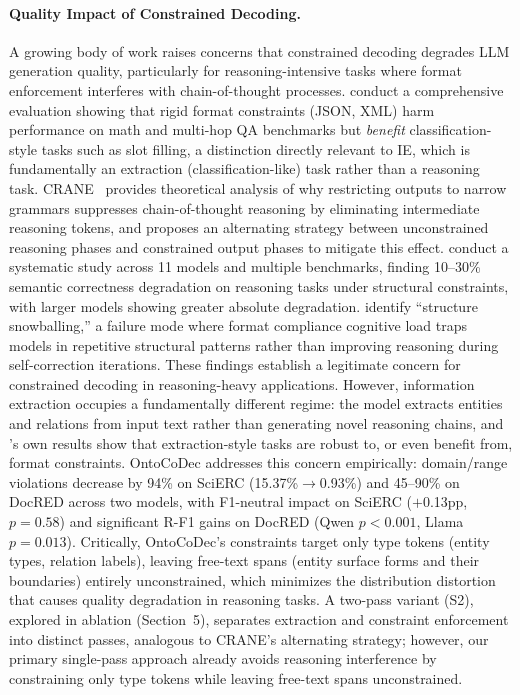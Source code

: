 \paragraph{Quality Impact of Constrained Decoding.}
A growing body of work raises concerns that constrained decoding degrades LLM generation quality, particularly for reasoning-intensive tasks where format enforcement interferes with chain-of-thought processes.
\citet{tam2024letmespeak} conduct a comprehensive evaluation showing that rigid format constraints (JSON, XML) harm performance on math and multi-hop QA benchmarks but \emph{benefit} classification-style tasks such as slot filling, a distinction directly relevant to IE, which is fundamentally an extraction (classification-like) task rather than a reasoning task.
CRANE~\cite{banerjee2025crane} provides theoretical analysis of why restricting outputs to narrow grammars suppresses chain-of-thought reasoning by eliminating intermediate reasoning tokens, and proposes an alternating strategy between unconstrained reasoning phases and constrained output phases to mitigate this effect.
\citet{schall2025hiddencost} conduct a systematic study across 11 models and multiple benchmarks, finding 10--30\% semantic correctness degradation on reasoning tasks under structural constraints, with larger models showing greater absolute degradation.
\citet{zhou2026snowballing} identify ``structure snowballing,'' a failure mode where format compliance cognitive load traps models in repetitive structural patterns rather than improving reasoning during self-correction iterations.
These findings establish a legitimate concern for constrained decoding in reasoning-heavy applications.
However, information extraction occupies a fundamentally different regime: the model extracts entities and relations from input text rather than generating novel reasoning chains, and \citet{tam2024letmespeak}'s own results show that extraction-style tasks are robust to, or even benefit from, format constraints.
OntoCoDec addresses this concern empirically: domain/range violations decrease by 94\% on SciERC (15.37\%$\to$0.93\%) and 45--90\% on DocRED across two models, with F1-neutral impact on SciERC ($+$0.13pp, $p{=}0.58$) and significant R-F1 gains on DocRED (Qwen $p{<}0.001$, Llama $p{=}0.013$).
Critically, OntoCoDec's constraints target only type tokens (entity types, relation labels), leaving free-text spans (entity surface forms and their boundaries) entirely unconstrained, which minimizes the distribution distortion that causes quality degradation in reasoning tasks.
A two-pass variant (S2), explored in ablation (Section~5), separates extraction and constraint enforcement into distinct passes, analogous to CRANE's alternating strategy; however, our primary single-pass approach already avoids reasoning interference by constraining only type tokens while leaving free-text spans unconstrained.

